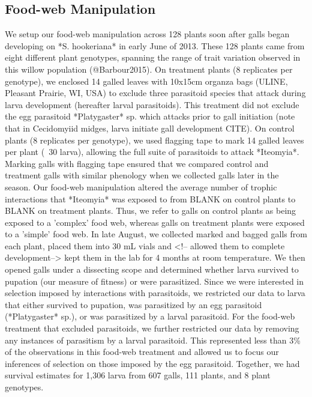 \documentclass[11pt]{article}
\begin{document}
\subsection*{Food-web Manipulation}

We setup our food-web manipulation across 128 plants soon after galls began developing on *S. hookeriana* in early June of 2013. 
These 128 plants came from eight different plant genotypes, spanning the range of trait variation observed in this willow population (@Barbour2015). 
On treatment plants (8 replicates per genotype), we enclosed 14 galled leaves with 10x15cm organza bags (ULINE, Pleasant Prairie, WI, USA) to exclude three parasitoid species that attack during larva development (hereafter larval parasitoids). 
This treatment did not exclude the egg parasitoid *Platygaster* sp. which attacks prior to gall initiation (note that in Cecidomyiid midges, larva initiate gall development CITE). 
On control plants (8 replicates per genotype), we used flagging tape to mark 14 galled leaves per plant (~30 larva), allowing the full suite of parasitoids to attack *Iteomyia*. 
Marking galls with flagging tape ensured that we compared control and treatment galls with similar phenology when we collected galls later in the season. 
Our food-web manipulation altered the average number of trophic interactions that *Iteomyia* was exposed to from BLANK on control plants to BLANK on treatment plants. 
Thus, we refer to galls on control plants as being exposed to a 'complex' food web, whereas galls on treatment plants were exposed to a 'simple' food web.
In late August, we collected marked and bagged galls from each plant, placed them into 30 mL vials and <!-- allowed them to complete development--> kept them in the lab for 4 months at room temperature. 
We then opened galls under a dissecting scope and determined whether larva survived to pupation (our measure of fitness) or were parasitized. Since we were interested in selection imposed by interactions with parasitoids, we restricted our data to larva that either survived to pupation, was parasitized by an egg parasitoid (*Platygaster* sp.), or was parasitized by a larval parasitoid. For the food-web treatment that excluded parasitoids, we further restricted our data by removing any instances of parasitism by a larval parasitoid. This represented less than 3\% of the observations in this food-web treatment and allowed us to focus our inferences of selection on those imposed by the egg parasitoid.  
Together, we had survival estimates for 1,306 larva from 607 galls, 111 plants, and 8 plant genotypes.
\end{document}
